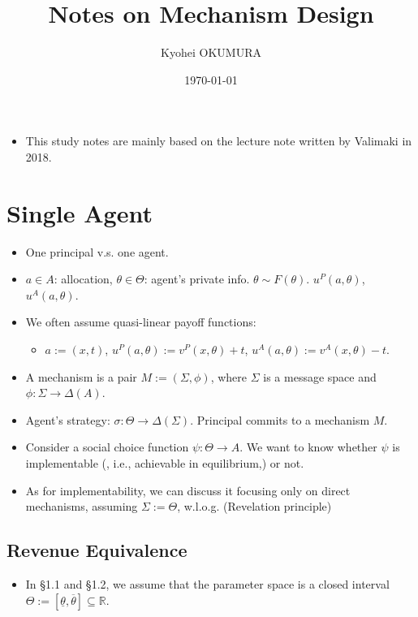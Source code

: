 \documentclass[11pt,a4paper,dvipdfmx]{article}
\theoremstyle{plain}
\newcommand{\R}{\mathbb{R}}
\renewcommand{\bar}{\overline}
\newcommand{\1}{\mathbbm{1}}
\begin{document}
\title{Notes on Mechanism Design}
\author{Kyohei OKUMURA
}
\date{\today}
\maketitle

\begin{itemize}
	\item This study notes are mainly based on the lecture note written by Valimaki in 2018.
\end{itemize}

\section{Single Agent}
\begin{itemize}
	\item One principal v.s. one agent.
	\item $a \in A$: allocation, $\theta \in \Theta$: agent's private info. $\theta \sim F(\theta)$. $u^P(a, \theta)$, $u^A(a, \theta)$.
	\item We often assume quasi-linear payoff functions:
	\begin{itemize}
	\item $a := (x, t)$, $u^P(a, \theta) := v^P(x, \theta) + t$, $u^A(a, \theta) := v^A(x, \theta) - t$.
	\end{itemize}
	\item A mechanism is a pair $M := (\Sigma, \phi)$, where $\Sigma$ is a message space and $\phi: \Sigma \to \Delta(A)$.
	\item Agent's strategy: $\sigma: \Theta \to \Delta(\Sigma)$. Principal commits to a mechanism $M$.
	\item Consider a social choice function $\psi: \Theta \to A$. We want to know whether $\psi$ is implementable (, i.e., achievable in equilibrium,) or not.
	\item As for implementability, we can discuss it focusing only on direct mechanisms, assuming $\Sigma := \Theta$, w.l.o.g. (Revelation principle)
\end{itemize}


\subsection{Revenue Equivalence}
\begin{itemize}
	\item In \S1.1 and \S1.2, we assume that the parameter space is a closed interval $\Theta := [\underline{\theta}, \bar{\theta}] \subseteq \R$.
\end{itemize}
\end{document}
